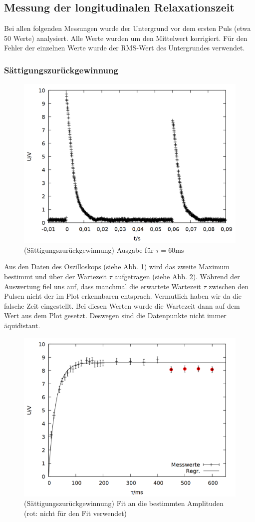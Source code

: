 \subsection{Messung der longitudinalen Relaxationszeit}
Bei allen folgenden Messungen wurde der Untergrund vor dem ersten Puls (etwa 50 Werte) analysiert. Alle Werte wurden um den Mittelwert korrigiert. Für den Fehler der einzelnen Werte wurde der RMS-Wert des Untergrundes verwendet.
\subsubsection{Sättigungszurückgewinnung}
\begin{figure}[h]
\centering
\includegraphics[width=0.75\linewidth]{data/p402_443_data/saettigungszurueckgewinnung/plot_81.png}
\caption{(Sättigungszurückgewinnung) Ausgabe für $\tau = 60\si{\milli\second}$}
\label{fig:sat_bsp}
\end{figure}
Aus den Daten des Oszilloskops (siehe Abb. \ref{fig:sat_bsp}) wird das zweite Maximum bestimmt und über der Wartezeit $\tau$ aufgetragen (siehe Abb. \ref{fig:sat_data}). Während der Auswertung fiel uns auf, dass manchmal die erwartete Wartezeit $\tau$ zwischen den Pulsen nicht der im Plot erkennbaren entsprach. Vermutlich haben wir da die falsche Zeit eingestellt. Bei diesen Werten wurde die Wartezeit dann auf dem Wert aus dem Plot gesetzt. Deswegen sind die Datenpunkte nicht immer äquidistant. 
\begin{figure}[h]
\centering
\includegraphics[width=0.75\linewidth]{data/p402_443_data/saettigungszurueckgewinnung/out_sat.png}
\caption{(Sättigungszurückgewinnung) Fit an die bestimmten Amplituden (rot: nicht für den Fit verwendet)}
\label{fig:sat_data}
\end{figure}

